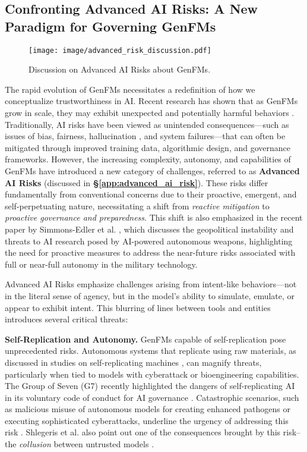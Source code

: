 \subsection{Confronting Advanced AI Risks: A New Paradigm for Governing GenFMs}


\begin{figure}[h]
    \centering
    \texttt{[image: image/advanced\_risk\_discussion.pdf]}
    \caption{Discussion on Advanced AI Risks about GenFMs.}
    \label{fig:advanced_risk_discussion}
\end{figure}

The rapid evolution of GenFMs necessitates a redefinition of how we conceptualize trustworthiness in AI. Recent research has shown that as GenFMs grow in scale, they may exhibit unexpected and potentially harmful behaviors \cite{mckenzie2023inverse}. Traditionally, AI risks have been viewed as unintended consequences—such as issues of bias, fairness, hallucination \cite{huang2023survey}, and system failures—that can often be mitigated through improved training data, algorithmic design, and governance frameworks. However, the increasing complexity, autonomy, and capabilities of GenFMs have introduced a new category of challenges, referred to as \textbf{Advanced AI Risks} (discussed in \textbf{\S\ref{app:advanced_ai_risk}}). These risks differ fundamentally from conventional concerns due to their proactive, emergent, and self-perpetuating nature, necessitating a shift from \textit{reactive mitigation} to \textit{proactive governance and preparedness}. This shift is also emphasized in the recent paper by Simmons-Edler et al. \cite{simmons2024ai}, which discusses the geopolitical instability and threats to AI research posed by AI-powered autonomous weapons, highlighting the need for proactive measures to address the near-future risks associated with full or near-full autonomy in the military technology.




Advanced AI Risks emphasize challenges arising from intent-like behaviors—not in the literal sense of agency, but in the model's ability to simulate, emulate, or appear to exhibit intent. This blurring of lines between tools and entities introduces several critical threats:

\textbf{Self-Replication and Autonomy.} GenFMs capable of self-replication pose unprecedented risks. Autonomous systems that replicate using raw materials, as discussed in studies on self-replicating machines \cite{self_replicating_machine, stenzel2024self}, can magnify threats, particularly when tied to models with cyberattack or bioengineering capabilities. The Group of Seven (G7) recently highlighted the dangers of self-replicating AI in its voluntary code of conduct for AI governance \cite{hiroshima_guiding_principles_2023}. Catastrophic scenarios, such as malicious misuse of autonomous models for creating enhanced pathogens or executing sophisticated cyberattacks, underline the urgency of addressing this risk \cite{lee2024prompt, tang2024prioritizing}. Shlegeris et al. also point out one of the consequences brought by this risk--the \textit{collusion} between untrusted models \cite{prevent_collusion_untrusted_models}.

